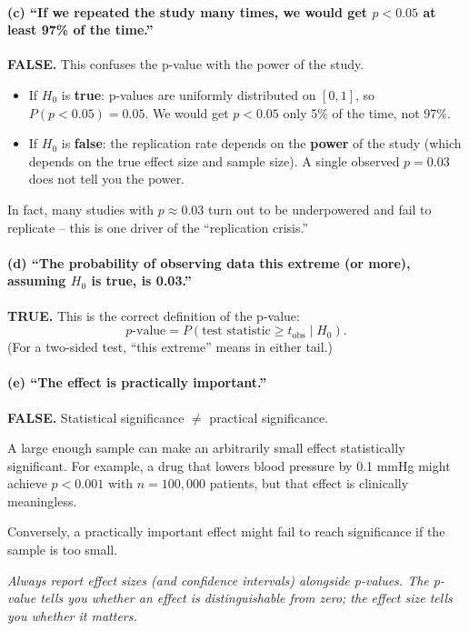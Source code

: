 \documentclass[11pt]{article}
\begin{document}
\paragraph{(c) ``If we repeated the study many times, we would get $p < 0.05$ at least 97\% of the time.''}

\textbf{FALSE.} This confuses the p-value with the power of the study.

\begin{itemize}
  \item If $H_0$ is \textbf{true}: p-values are uniformly distributed on $[0, 1]$, so $P(p < 0.05) = 0.05$. We would get $p < 0.05$ only 5\% of the time, not 97\%.
  \item If $H_0$ is \textbf{false}: the replication rate depends on the \textbf{power} of the study (which depends on the true effect size and sample size). A single observed $p = 0.03$ does not tell you the power.
\end{itemize}

In fact, many studies with $p \approx 0.03$ turn out to be underpowered and fail to replicate -- this is one driver of the ``replication crisis.''

\paragraph{(d) ``The probability of observing data this extreme (or more), assuming $H_0$ is true, is 0.03.''}

\textbf{TRUE.} This is the correct definition of the p-value:
\[
  p\text{-value} = P(\text{test statistic} \geq t_{\text{obs}} \mid H_0).
\]
(For a two-sided test, ``this extreme'' means in either tail.)

\paragraph{(e) ``The effect is practically important.''}

\textbf{FALSE.} Statistical significance $\neq$ practical significance.

A large enough sample can make an arbitrarily small effect statistically significant. For example, a drug that lowers blood pressure by 0.1 mmHg might achieve $p < 0.001$ with $n = 100{,}000$ patients, but that effect is clinically meaningless.

Conversely, a practically important effect might fail to reach significance if the sample is too small.

\textit{Always report effect sizes (and confidence intervals) alongside p-values. The p-value tells you whether an effect is distinguishable from zero; the effect size tells you whether it matters.}
\end{document}
